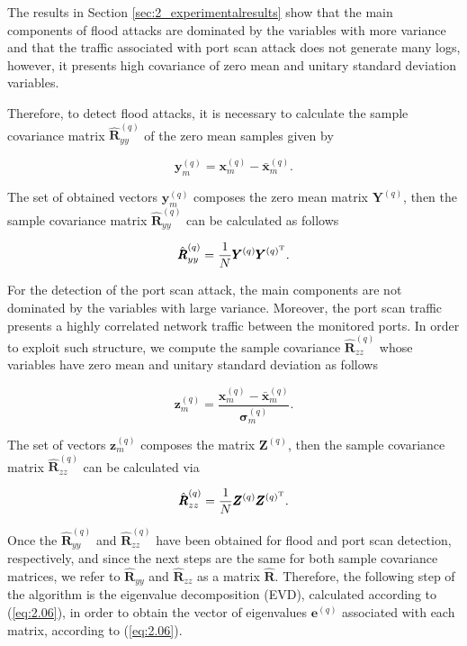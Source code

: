 The results in Section \ref{sec:2_experimentalresults} show that the main components of flood attacks are dominated by the variables with more variance and that the traffic associated with port scan attack does not generate many logs, however, it presents high covariance of zero mean and unitary standard deviation variables.

Therefore, to detect flood attacks, it is necessary to calculate the sample covariance matrix $\hat{\pmb{R}}_{yy}^{(q)}$ of the zero mean samples given by

\begin{equation}
\label{eq:2.02}
\pmb{y}_{m}^{(q)} = \pmb{x}_{m}^{(q)} - \bar{\pmb{x}}_{m}^{(q)}.
\end{equation}

The set of obtained vectors $\pmb{y}_{m}^{(q)}$ composes the zero mean matrix $\pmb{Y}^{(q)}$, then the sample covariance matrix $\hat{\pmb{R}}_{yy}^{(q)}$ can be calculated as follows

\begin{equation}\label{eq:2.03}
\hat{\pmb{R}}_{yy}^{(q)} = \frac{1}{N}\pmb{Y}^{(q)}\pmb{Y}^{(q)^{\rm T}}.
\end{equation}

For the detection of the port scan attack, the main components are not dominated by the variables with large variance. Moreover, the port scan traffic presents a highly correlated network traffic between the monitored ports. In order to exploit such structure, we compute the sample covariance $\hat{\pmb{R}}_{zz}^{(q)}$ whose variables have zero mean and unitary standard deviation as follows

\begin{equation}
\label{eq:2.04}
\pmb{z}_{m}^{(q)} = \frac{\pmb{x}_{m}^{(q)} - \bar{\pmb{x}}_{m}^{(q)}}{\pmb{\sigma}_{m}^{(q)}}.
\end{equation}

The set of vectors $\pmb{z}_{m}^{(q)}$ composes the matrix $\pmb{Z}^{(q)}$, then the sample covariance matrix $\hat{\pmb{R}}_{zz}^{(q)}$ can be calculated via 

\begin{equation}\label{eq:2.05}
\hat{\pmb{R}}_{zz}^{(q)} = \frac{1}{N}\pmb{Z}^{(q)}\pmb{Z}^{(q)^{\rm T}}.
\end{equation}

Once the $\hat{\pmb{R}}_{yy}^{(q)}$ and $\hat{\pmb{R}}_{zz}^{(q)}$ have been obtained for flood and port scan detection, respectively, and since the next steps are the same for both sample covariance matrices, we refer to $\hat{\pmb{R}}_{yy}$ and $\hat{\pmb{R}}_{zz}$ as a matrix $\hat{\pmb{R}}$. Therefore, the following step of the algorithm is the eigenvalue decomposition (EVD), calculated according to (\ref{eq:2.06}), in order to obtain the vector of eigenvalues $\pmb{e}^{(q)}$ associated with each matrix, according to (\ref{eq:2.06}).

